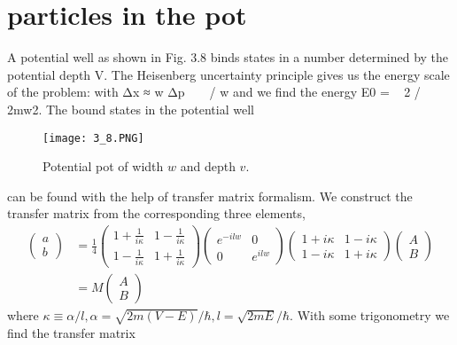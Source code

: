 \section{particles in the pot}
A potential well as shown in Fig. 3.8 binds states in a number determined by the potential depth V. The Heisenberg uncertainty principle gives us the energy scale of the problem: with Δx ≈ w Δp ~ ~ / w and we find the energy E0 = ~ 2 / 2mw2. The bound states in the potential well
\begin{figure}[ht]
    \begin{minipage}{0.5\textwidth}
        \centering
        \texttt{[image: 3\_8.PNG]}
    \end{minipage}
    \begin{minipage}{0.5\textwidth}
        \caption{Potential pot of width $w$ and depth $v$.}
    \end{minipage}
\end{figure}
can be found with the help of transfer matrix formalism. We construct the transfer matrix from the corresponding three elements,
$$
\begin{aligned}\left(\begin{array}{l}{a} \\ {b}\end{array}\right) &=\frac{1}{4}\left(\begin{array}{cc}{1+\frac{1}{i \kappa}} & {1-\frac{1}{i \kappa}} \\ {1-\frac{1}{i \kappa}} & {1+\frac{1}{i \kappa}}\end{array}\right)\left(\begin{array}{cc}{e^{-i l w}} & {0} \\ {0} & {e^{i l w}}\end{array}\right)\left(\begin{array}{cc}{1+i \kappa} & {1-i \kappa} \\ {1-i \kappa} & {1+i \kappa}\end{array}\right)\left(\begin{array}{c}{A} \\ {B}\end{array}\right) \\ &=M\left(\begin{array}{c}{A} \\ {B}\end{array}\right) \end{aligned}
$$
where $\kappa ≡ \alpha / l, \alpha = \sqrt{2m(V-E)}/\hbar, l=\sqrt{2mE}/\hbar$. With some trigonometry we find the transfer matrix

